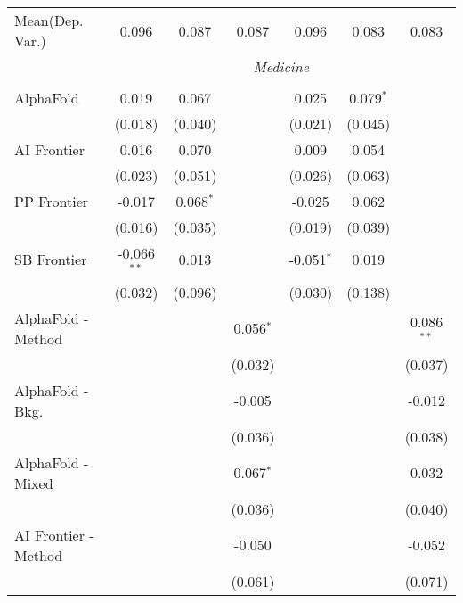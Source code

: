 \begin{tabular}{lcccccc}
Mean(Dep. Var.) & 0.096 & 0.087 & 0.087 & 0.096 & 0.083 & 0.083 \\
 & \multicolumn{6}{c}{\textit{Medicine}} \\ \\
   AlphaFold            & 0.019         & 0.067       &                & 0.025        & 0.079$^{*}$ &   \\   
                        & (0.018)       & (0.040)     &                & (0.021)      & (0.045)     &   \\   
   AI Frontier          & 0.016         & 0.070       &                & 0.009        & 0.054       &   \\   
                        & (0.023)       & (0.051)     &                & (0.026)      & (0.063)     &   \\   
   PP Frontier          & -0.017        & 0.068$^{*}$ &                & -0.025       & 0.062       &   \\   
                        & (0.016)       & (0.035)     &                & (0.019)      & (0.039)     &   \\   
   SB Frontier          & -0.066$^{**}$ & 0.013       &                & -0.051$^{*}$ & 0.019       &   \\   
                        & (0.032)       & (0.096)     &                & (0.030)      & (0.138)     &   \\   
   AlphaFold - Method   &               &             & 0.056$^{*}$    &              &             & 0.086$^{**}$\\   
                        &               &             & (0.032)        &              &             & (0.037)\\   
   AlphaFold - Bkg.     &               &             & -0.005         &              &             & -0.012\\   
                        &               &             & (0.036)        &              &             & (0.038)\\   
   AlphaFold - Mixed    &               &             & 0.067$^{*}$    &              &             & 0.032\\   
                        &               &             & (0.036)        &              &             & (0.040)\\   
   AI Frontier - Method &               &             & -0.050         &              &             & -0.052\\   
                        &               &             & (0.061)        &              &             & (0.071)\\   

\end{tabular}
